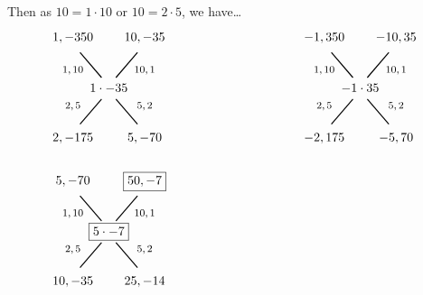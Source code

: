 \documentclass[12pt,letterpaper]{exam}
\begin{document}
\begin{questions}
{Then as $10= 1 \cdot 10$ or $10= 2 \cdot 5$, we have\dots
	\[
	\begin{tikzpicture}
	\node at (0,0) {$1 \cdot -35$};

	\node at (-1,0.5) {\footnotesize$1, 10$};
	\draw[line width=0.03cm,label={1}] (-0.2,0.3) -- (-0.8,1);
	\node at (-1,1.4) {$1, -350$};

	\node at (1,0.5) {\footnotesize$10, 1$};
	\draw[line width=0.03cm,label={1}] (0.2,0.3) -- (0.8,1);
	\node at (1,1.4) {$10, -35$};	
	
	\node at (-1,-0.5) {\footnotesize$2, 5$};
	\draw[line width=0.03cm,label={1}] (-0.2,-0.3) -- (-0.8,-1);
	\node at (-1,-1.4) {$2, -175$};

	\node at (1,-0.5) {\footnotesize$5, 2$};
	\draw[line width=0.03cm,label={1}] (0.2,-0.3) -- (0.8,-1);
	\node at (1,-1.4) {$5, -70$};

	\tikzset{shift={(7,0)}}
	
	\node at (0,0) {$-1 \cdot 35$};

	\node at (-1,0.5) {\footnotesize$1, 10$};
	\draw[line width=0.03cm,label={1}] (-0.2,0.3) -- (-0.8,1);
	\node at (-1,1.4) {$-1, 350$};

	\node at (1,0.5) {\footnotesize$10, 1$};
	\draw[line width=0.03cm,label={1}] (0.2,0.3) -- (0.8,1);
	\node at (1,1.4) {$-10, 35$};	
	
	\node at (-1,-0.5) {\footnotesize$2, 5$};
	\draw[line width=0.03cm,label={1}] (-0.2,-0.3) -- (-0.8,-1);
	\node at (-1,-1.4) {$-2, 175$};

	\node at (1,-0.5) {\footnotesize$5, 2$};
	\draw[line width=0.03cm,label={1}] (0.2,-0.3) -- (0.8,-1);
	\node at (1,-1.4) {$-5, 70$};
		
	\tikzset{shift={(-7,-4)}}
	
	\node at (0,0) {\framebox{$5 \cdot -7$}};

	\node at (-1,0.5) {\footnotesize$1, 10$};
	\draw[line width=0.03cm,label={1}] (-0.2,0.3) -- (-0.8,1);
	\node at (-1,1.4) {$5, -70$};

	\node at (1,0.5) {\footnotesize$10, 1$};
	\draw[line width=0.03cm,label={1}] (0.2,0.3) -- (0.8,1);
	\node at (1,1.4) {\framebox{$50, -7$}};	
	
	\node at (-1,-0.5) {\footnotesize$2, 5$};
	\draw[line width=0.03cm,label={1}] (-0.2,-0.3) -- (-0.8,-1);
	\node at (-1,-1.4) {$10, -35$};

	\node at (1,-0.5) {\footnotesize$5, 2$};
	\draw[line width=0.03cm,label={1}] (0.2,-0.3) -- (0.8,-1);
	\node at (1,-1.4) {$25, -14$};
	

\end{tikzpicture}\]}
\end{questions}
\end{document}
